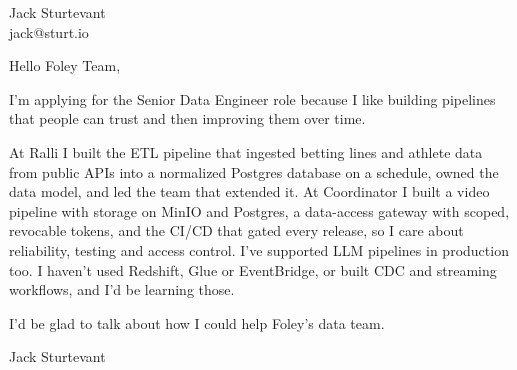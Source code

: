 \documentclass[11pt]{article}
\begin{document}
\raggedright

{\namefont\fontsize{20pt}{24pt}\selectfont Jack Sturtevant}\\[-0.3em]
jack@sturt.io

\vspace{1.2em}

Hello Foley Team,

I'm applying for the Senior Data Engineer role because I like building pipelines that people can trust and then improving them over time.

At Ralli I built the ETL pipeline that ingested betting lines and athlete data from public APIs into a normalized Postgres database on a schedule, owned the data model, and led the team that extended it. At Coordinator I built a video pipeline with storage on MinIO and Postgres, a data-access gateway with scoped, revocable tokens, and the CI/CD that gated every release, so I care about reliability, testing and access control. I've supported LLM pipelines in production too. I haven't used Redshift, Glue or EventBridge, or built CDC and streaming workflows, and I'd be learning those.

I'd be glad to talk about how I could help Foley's data team.

\vspace{0.6em}
Jack Sturtevant
\end{document}
